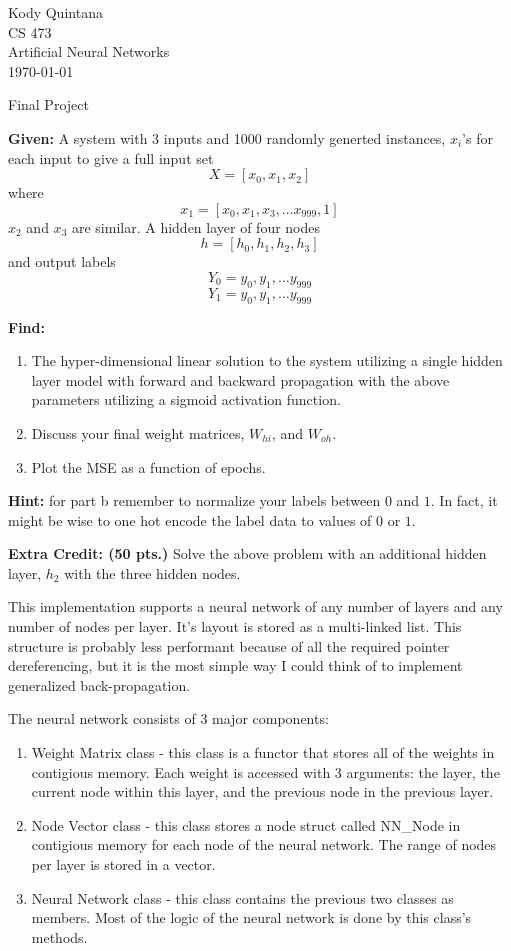 \documentclass[14pt]{article}
\begin{document}
\begin{flushleft}
 
\large
Kody Quintana\\
CS 473\\
Artificial Neural Networks\\
\today\\
\boldmath

\begin{center}
Final Project
\end{center}

\question
\textbf{Given:}
	A system with 3 inputs and 1000 randomly generted instances, $x_i$'s
	for each input to give a full input set
	\[X = [x_0, x_1, x_2] \]
	where
	\[x_1 = [x_0, x_1, x_3, \ldots x_{999}, 1]\]
	$x_2$ and $x_3$ are similar.
	A hidden layer of four nodes
	\[h = [h_0, h_1, h_2, h_3]\]
	and output labels
	\[Y_0 = y_0, y_1, \ldots y_{999}\]
	\[Y_1 = y_0, y_1, \ldots y_{999}\]
	
\textbf{Find:}
	\begin{enumerate}
	\item The hyper-dimensional linear solution to the system utilizing a single hidden layer model
		with forward and backward propagation with the above parameters
		utilizing a sigmoid activation function.
	\item Discuss your final weight matrices, $W_{hi}$, and $W_{oh}$.
	\item Plot the MSE as a function of epochs.
	\end{enumerate}

\textbf{Hint:}
	for part b remember to normalize your labels between $0$ and $1$.
	In fact, it might be wise to one hot encode the label data to values of $0$ or $1$.
\closequestion

\question
\textbf{Extra Credit: (50 pts.)}
	Solve the above problem with an additional hidden layer, $h_2$ with the three hidden nodes.
\closequestion

\newpage
This implementation supports a neural network of any number of layers and any number of nodes per layer.
It's layout is stored as a multi-linked list.		
This structure is probably less performant because of all the required pointer dereferencing,
but it is the most simple way I could think of to implement generalized back-propagation.

The neural network consists of 3 major components:
\begin{enumerate}
	\item Weight Matrix class - this class is a functor that stores all of the weights in contigious memory.
		Each weight is accessed with 3 arguments:
		the layer, the current node within this layer, and the previous node in the previous layer.
	\item Node Vector class - this class stores a node struct called NN\_Node in contigious memory
		for each node of the neural network. The range of nodes per layer is stored in a vector.
	\item Neural Network class - this class contains the previous two classes as members.
		Most of the logic of the neural network is done by this class's methods.
\end{enumerate}


\end{flushleft}
\end{document}

